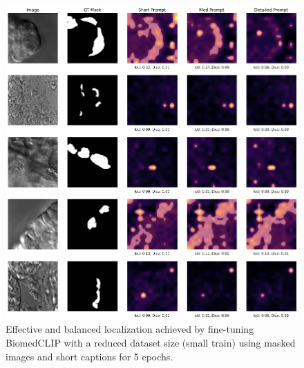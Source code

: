 \documentclass[./dissertation.tex]{subfiles}
\begin{document}
\begin{figure}
  \centering
  \includegraphics[width=\textwidth]{figures/sam/fine-tuned masks small train short desc ep5.png}
  \caption{Effective and balanced localization achieved by fine-tuning BiomedCLIP with a reduced dataset size (small train) using masked images and short captions for 5 epochs.}
  \label{fig:fine_tuned_mask_small_short_ep5}
\end{figure}
\end{document}
